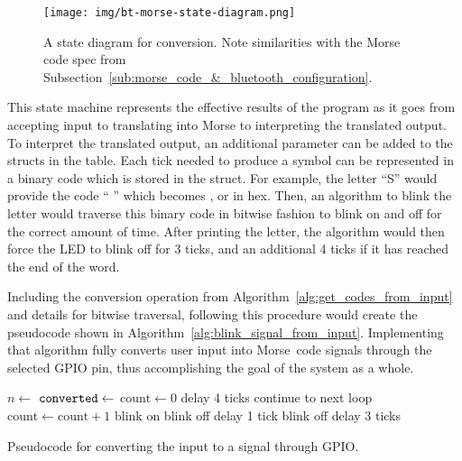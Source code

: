 \documentclass[11pt]{article}
\begin{document}
\begin{figure}[ht]
    \centering
    \texttt{[image: img/bt-morse-state-diagram.png]}
    \caption{A state diagram for conversion. Note similarities with the Morse code spec from Subsection~\ref{sub:morse_code_&_bluetooth_configuration}.}
    \label{fig:bt-morse-state-diagram}
\end{figure}


This state machine represents the effective results of the program as it goes from accepting input to translating into Morse to interpreting the translated output.
To interpret the translated output, an additional parameter can be added to the structs in the table.
Each tick needed to produce a symbol can be represented in a binary code which is stored in the struct.
For example, the letter ``S'' would provide the code ``\textbullet{} \textbullet{} \textbullet{}'' which becomes , or  in hex.
Then, an algorithm to blink the letter would traverse this binary code in bitwise fashion to blink on and off for the correct amount of time.
After printing the letter, the algorithm would then force the LED to blink off for 3 ticks, and an additional 4 ticks if it has reached the end of the word.


Including the conversion operation from Algorithm~\ref{alg:get_codes_from_input} and details for bitwise traversal, following this procedure would create the pseudocode shown in Algorithm~\ref{alg:blink_signal_from_input}.
Implementing that algorithm fully converts user input into Morse~code signals through the selected GPIO pin, thus accomplishing the goal of the system as a whole.


\begin{algorithm}[ht]
    \begin{algorithmic}[l]
        \State $n \gets$ 
        \State $\texttt{converted} \gets$ 
            \State $\text{count} \gets 0$
                \State delay 4 ticks
                \State continue to next loop
            \EndIf
                \State $\text{count} \gets \text{count} + 1$
            \EndWhile
                    \State blink on
                \Else
                    \State blink off
                \EndIf
                \State delay 1 tick
            \EndFor
            \State blink off
            \State delay 3 ticks
        \EndFor
        \EndProcedure
    \end{algorithmic}
    \caption{Pseudocode for converting the input to a signal through GPIO.}
    \label{alg:blink_signal_from_input}
\end{algorithm}
\end{document}
